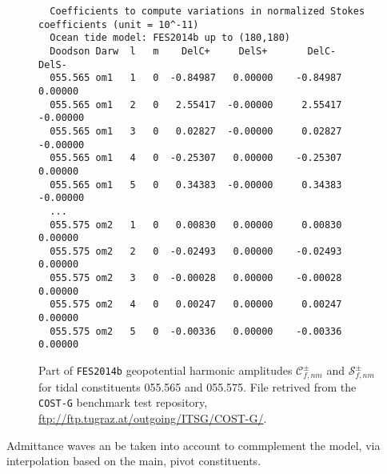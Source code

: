 \begin{figure}
  \begin{adjustbox}{max width=\linewidth , fbox=0.5pt}
  \begin{BVerbatim}
  Coefficients to compute variations in normalized Stokes coefficients (unit = 10^-11)
  Ocean tide model: FES2014b up to (180,180)
  Doodson Darw  l   m    DelC+     DelS+       DelC-     DelS-
  055.565 om1   1   0  -0.84987   0.00000    -0.84987   0.00000
  055.565 om1   2   0   2.55417  -0.00000     2.55417  -0.00000
  055.565 om1   3   0   0.02827  -0.00000     0.02827  -0.00000
  055.565 om1   4   0  -0.25307   0.00000    -0.25307   0.00000
  055.565 om1   5   0   0.34383  -0.00000     0.34383  -0.00000
  ...
  055.575 om2   1   0   0.00830   0.00000     0.00830   0.00000   
  055.575 om2   2   0  -0.02493   0.00000    -0.02493   0.00000   
  055.575 om2   3   0  -0.00028   0.00000    -0.00028   0.00000   
  055.575 om2   4   0   0.00247   0.00000     0.00247   0.00000   
  055.575 om2   5   0  -0.00336   0.00000    -0.00336   0.00000   
  \end{BVerbatim}
  \end{adjustbox}
  \caption{Part of \texttt{FES2014b} geopotential harmonic amplitudes
  $\mathcal{C}_{f,nm}^{\pm}$ and $\mathcal{S}_{f,nm}^{\pm}$ for tidal constituents
  055.565 and 055.575. File retrived from the \texttt{COST-G} benchmark test 
  repository, \url{ftp://ftp.tugraz.at/outgoing/ITSG/COST-G/}.}
\end{figure}

Admittance waves an be taken into account to commplement the model, via interpolation 
based on the main, pivot constituents.

